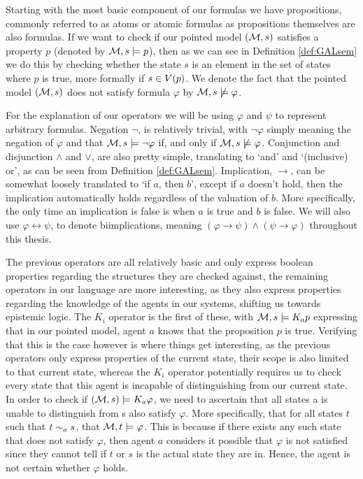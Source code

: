 Starting with the most basic component of our formulas we have propositions, commonly referred to as atoms or atomic formulas as propositions themselves are also formulas. If we want to check if our pointed model $(\mathcal{M},s)$ satisfies a property $p$ (denoted by $\mathcal{M},s\models p$), then as we can see in Definition \ref{def:GALsem} we do this by checking whether the state $s$ is an element in the set of states where $p$ is true, more formally if $s \in V(p)$. We denote the fact that the pointed model $(\mathcal{M},s)$ does not satisfy formula $\varphi$ by $\mathcal{M},s \not\models\varphi$.

For the explanation of our operators we will be using $\varphi$ and $\psi$ to represent arbitrary formulas. Negation $\neg$, is relatively trivial, with $\neg\varphi$ simply meaning the negation of $\varphi$ and that $\mathcal{M},s \models \neg\varphi$ if, and only if $\mathcal{M},s \not\models\varphi$. Conjunction and disjunction $\wedge$ and $\vee$, are also pretty simple, translating to `and' and `(inclusive) or', as can be seen from Definition \ref{def:GALsem}. Implication, $\rightarrow$, can be somewhat loosely translated to `if $a$, then $b$', except if $a$ doesn't hold, then the implication automatically holds regardless of the valuation of $b$. More specifically, the only time an implication is false is when $a$ is true and $b$ is false. We will also use $\varphi \leftrightarrow \psi$, to denote biimplications, meaning $(\varphi \rightarrow \psi) \wedge (\psi \rightarrow \varphi)$ throughout this thesis. 

The previous operators are all relatively basic and only express boolean properties regarding the structures they are checked against, the remaining operators in our language are more interesting, as they also express properties regarding the knowledge of the agents in our systems, shifting us towards epistemic logic. The $K_i$ operator is the first of these, with $\mathcal{M},s \models K_ap$ expressing that in our pointed model, agent $a$ knows that the proposition $p$ is true. Verifying that this is the case however is where things get interesting, as the previous operators only express properties of the current state, their scope is also limited to that current state, whereas the $K_i$ operator potentially requires us to check every state that this agent is incapable of distinguishing from our current state. In order to check if $(\mathcal{M},s) \models K_a\varphi$, we need to ascertain that all states a is unable to distinguish from s also satisfy $\varphi$. More specifically, that for all states $t$ such that $t\sim_as$, that $\mathcal{M},t \models\varphi$. This is because if there exists any such state that does not satisfy $\varphi$, then agent $a$ considers it possible that $\varphi$ is not satisfied since they cannot tell if $t$ or $s$ is the actual state they are in. Hence, the agent is not certain whether $\varphi$ holds.

